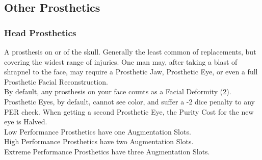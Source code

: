 \documentclass[a4paper, twocolumn, openany]{book}
\newlength{\indentlen}
\newcommand{\tabto}[1]{\setlength{\leftskip}{#1\indentlen}}
\begin{document}
{\tabto{0}\newpage
\subsection{Other Prosthetics}

\subsubsection{Head Prosthetics}
A prosthesis on or of the skull. Generally the least common of replacements, but covering the
widest range of injuries. One man may, after taking a blast of shrapnel to the face, may require
a Prosthetic Jaw, Prosthetic Eye, or even a full Prosthetic Facial Reconstruction.\\
By default, any prosthesis on your face counts as a Facial Deformity (2).\\
Prosthetic Eyes, by default, cannot see color, and suffer a -2 dice penalty to any PER check.
When getting a second Prosthetic Eye, the Purity Cost for the new eye is Halved.\\

Low Performance Prosthetics have one Augmentation Slots.\\
High Performance Prosthetics have two Augmentation Slots.\\
Extreme Performance Prosthetics have three Augmentation Slots.\\

}
\end{document}
